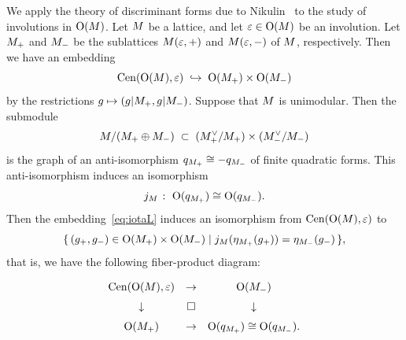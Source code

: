\documentclass{amsart} %
\begin{document}
%
%
%
We apply the theory of discriminant forms
due to Nikulin~\cite{MR525944}
to the study of involutions in $\mathord{\mathrm{O}}(M)$.
Let $M$ be a lattice, and 
let $\varepsilon \in \mathord{\mathrm{O}}(M)$ be an involution.
Let $M_+$ and $M_-$ be the sublattices
$M(\varepsilon, +)$ and $M(\varepsilon, -)$ of $M$, respectively.
Then we have an embedding
%
\begin{equation}\label{eq:iotaL}
\mathrm{Cen}(\mathord{\mathrm{O}}(M), \varepsilon)\;\hookrightarrow\; \mathord{\mathrm{O}}(M_+)\times \mathord{\mathrm{O}}(M_-)
\end{equation}
%
by the restrictions $g\mapsto (g|M_+, g|M_-)$.
Suppose that $M$ is unimodular.
Then the submodule
\[
M/(M_+\oplus M_-) \;\subset\; (M_+^{\vee}/M_+)\times (M_-^{\vee}/M_-)
\]
is the graph of an anti-isomorphism
$q_{M_+} \cong -q_{M_-}$
of finite quadratic forms.
This anti-isomorphism
induces an isomorphism
\[
j_M\;\colon\; \mathord{\mathrm{O}}(q_{M_+}) \cong \mathord{\mathrm{O}}(q_{M_-}).
\]
Then the embedding~\eqref{eq:iotaL} induces an isomorphism from $\mathrm{Cen}(\mathord{\mathrm{O}}(M), \varepsilon)$ to 
%
\begin{equation*}\label{eq:CenL}
\{\,{(g_{+}, g_{-})\in \mathord{\mathrm{O}}(M_+)\times \mathord{\mathrm{O}}(M_-)}\mid {j_M(\eta_{M_+}(g_{+}))=\eta_{M_-}(g_{-})} \,\},
\end{equation*}
%
that is, we have the following fiber-product diagram:
%
\begin{equation}\label{eq:groupfibprodCenvep}
\renewcommand{\arraystretch}{1.5}
\begin{array}{ccc}
\Cen(\OG(\dLat), \vep) &\to & \OG(\dLatminus) \\
\downarrow & \square& \downarrow \\
\OG(\dLatplus) & \to & \OG(q_{\dLatplus}) \cong \OG(q_{\dLatminus}).
\end{array}
\end{equation}
%
%
\end{document}
